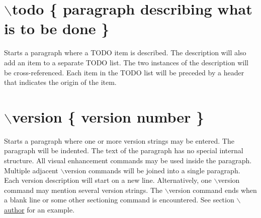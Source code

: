  \hypertarget{commands_cmdtodo}{}\section{$\backslash$todo \{ paragraph describing what is to be done \}}\label{commands_cmdtodo}
 Starts a paragraph where a TODO item is described. The description will also add an item to a separate TODO list. The two instances of the description will be cross-\/referenced. Each item in the TODO list will be preceded by a header that indicates the origin of the item.



 \hypertarget{commands_cmdversion}{}\section{$\backslash$version \{ version number \}}\label{commands_cmdversion}
 Starts a paragraph where one or more version strings may be entered. The paragraph will be indented. The text of the paragraph has no special internal structure. All visual enhancement commands may be used inside the paragraph. Multiple adjacent $\backslash$version commands will be joined into a single paragraph. Each version description will start on a new line. Alternatively, one $\backslash$version command may mention several version strings. The $\backslash$version command ends when a blank line or some other sectioning command is encountered. See section \hyperlink{commands_cmdauthor}{$\backslash$author} for an example.



